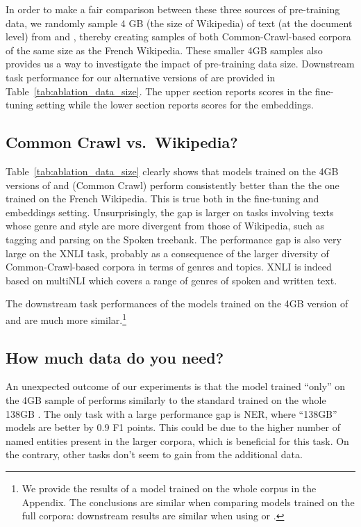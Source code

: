 In order to make a fair comparison between these three sources of pre-training data, we randomly sample 4 GB (the size of Wikipedia) of text (at the document level) from \oscar and \ccnet, thereby creating samples of both Common-Crawl-based corpora of the same size as the French Wikipedia. These smaller 4GB samples also provides us a way to investigate the impact of pre-training data size. Downstream task performance for our alternative versions of \camembert are provided in Table~\ref{tab:ablation_data_size}.
The upper section reports scores in the fine-tuning setting while the lower section reports scores for the embeddings.

\subsection{Common Crawl vs.~Wikipedia?}
\label{subsec:homogeneityimpact}

Table~\ref{tab:ablation_data_size} clearly shows that models trained on the 4GB versions of \oscar and \ccnet (Common Crawl) perform consistently better than the the one trained on the French Wikipedia. This is true both in the fine-tuning and embeddings setting. Unsurprisingly, the gap is larger on tasks involving texts whose genre and style are more divergent from those of Wikipedia, such as tagging and parsing on the Spoken treebank.
The performance gap is also very large on the XNLI task, probably as a consequence of the larger diversity of Common-Crawl-based corpora in terms of genres and topics. XNLI is indeed based on multiNLI which covers a range of genres of spoken and written text.

The downstream task performances of the models trained on the 4GB version of \ccnet and \oscar are much more similar.\footnote{We provide the results of a model trained on the whole \ccnet corpus in the Appendix. The conclusions are similar when comparing models trained on the full corpora: downstream results are similar when using \oscar or \ccnet.}


\subsection{How much data do you need?}
\label{subsec:sizeimpact}

An unexpected outcome of our experiments is that the model trained ``only'' on the 4GB sample of \oscar performs similarly  to the standard \camembert trained on the whole 138GB \oscar.
The only task with a large performance gap is NER, where  ``138GB'' models are better by 0.9 F1 points. This could be due to the higher number of named entities present in the larger corpora, which is beneficial for this task. On the contrary, other tasks don't seem to gain from the additional data.

